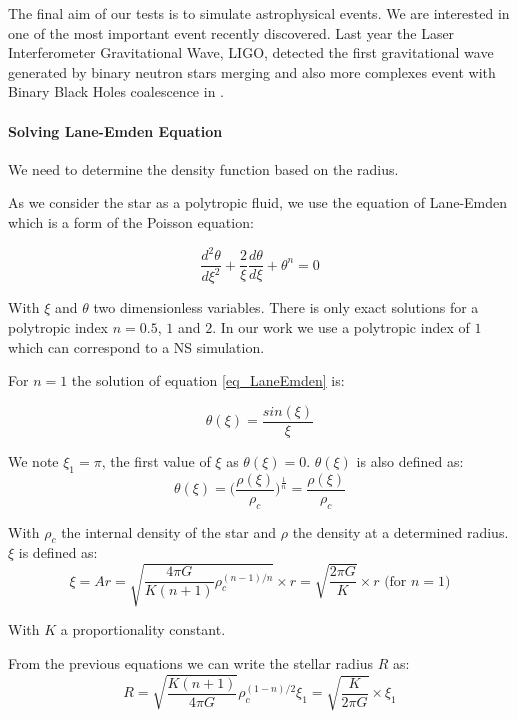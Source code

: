 The final aim of our tests is to simulate astrophysical events. 
We are interested in one of the most important event recently discovered. 
Last year the Laser Interferometer Gravitational Wave, LIGO, detected the first gravitational wave generated by binary neutron stars merging \cite{abbott2017gw170817} and also more complexes event with Binary Black Holes coalescence in \cite{abbott2017gw170814}.


\paragraph{Solving Lane-Emden Equation}

We need to determine the density function based on the radius. 

As we consider the star as a polytropic fluid, we use the equation of Lane-Emden which is a form of the Poisson equation: 

\begin{equation}\label{eq_LaneEmden}
  \frac{d^2\theta}{d \xi^2}+ \frac{2}{\xi}\frac{d\theta}{d\xi}+\theta^n = 0
\end{equation}

With $\xi$ and $\theta$ two dimensionless variables. 
There is only exact solutions for a polytropic index $n = 0.5$, $1$ and $2$.
In our work we use a polytropic index of $1$ which can correspond to a NS simulation.

For $n=1$ the solution of equation \ref{eq_LaneEmden} is: 

\begin{equation}
\theta(\xi)=\frac{sin(\xi)}{\xi}
\end{equation}

We note $\xi_1 = \pi$, the first value of $\xi$ as $\theta(\xi) = 0$.
$\theta(\xi)$ is also defined as: 
\begin{equation}
 \theta(\xi) = \Big(\frac{\rho(\xi)}{\rho_c}\Big)^{\frac{1}{n}}  = \frac{\rho(\xi)}{\rho_c}
\end{equation}

With $\rho_c$ the internal density of the star and $\rho$ the density at a determined radius. $\xi$ is defined as:  
$$ \xi = Ar = \sqrt{\frac{4\pi G}{K(n+1)}\rho_c^{(n-1)/n}} \times r = \sqrt{\frac{2\pi G}{K}}\times r \mbox{ (for } n=1 \mbox{)}$$

With $K$ a proportionality constant.

From the previous equations we can write the stellar radius $R$ as:
\begin{equation}
R = \sqrt{\frac{K(n+1)}{4\pi G}}\rho_c^{(1-n)/2}\xi_1 = \sqrt{ \frac{K}{2\pi G} } \times \xi_1
\end{equation} 

